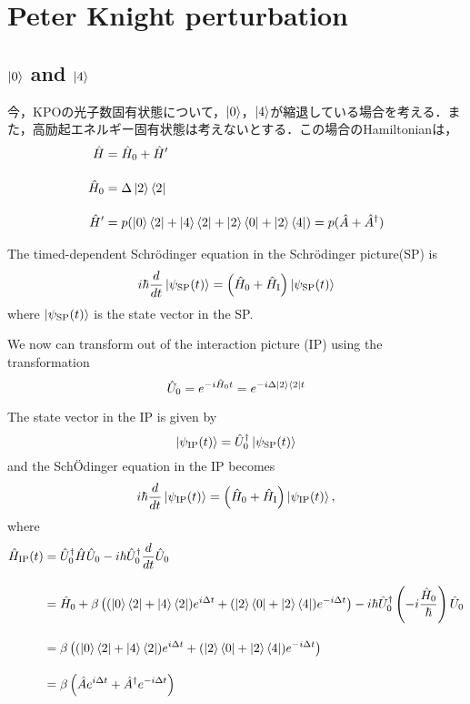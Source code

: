 \section{Peter Knight perturbation}
\subsection{$\ket{0}$ and $\ket{4}$}
今，KPOの光子数固有状態について，$\ket{0}$，$\ket{4}$が縮退している場合を考える．また，高励起エネルギー固有状態は考えないとする．この場合のHamiltonianは，
\begin{align}
    \hat{H} &= \hat{H}_0 + \hat{H}^{\prime}\\[10pt]
    \hat{H}_0 &= \Delta \ket{2}\bra{2}\nn[10pt]
    \hat{H}^{\prime} &
    = p(\ket{0}\bra{2} + \ket{4}\bra{2} + \ket{2}\bra{0} + \ket{2}\bra{4})
    = p(\hat{A} + \hat{A}^{\dagger})
\end{align}

The timed-dependent Schr\"{o}dinger equation in the Schr\"{o}dinger picture(SP) is
\begin{equation}
    i\hbar\frac{d}{dt}\ket{\psi_{\rm{SP}}(t)}
    =\left(
    \hat{H}_0+\hat{H}_{\rm{I}}
    \right)
    \ket{\psi_{\rm{SP}}(t)}
\end{equation}
where $\ket{\psi_{\rm{SP}}(t)}$ is the state vector in the SP.

We now can transform out of the interaction picture (IP) using the transformation
\begin{equation}
    {\hat{U}}_0=e^{-i\hat{H}_0 t}
    =e^{-i\Delta \ket{2}\bra{2} t}
\end{equation}

The state vector in the IP is given by
\begin{equation}
    \ket{\psi_{\rm{IP}}(t)}
    =\hat{U}_0^\dagger\ket{\psi_{\rm{SP}}(t)}
\end{equation}
and the Sch\"{O}dinger equation in the IP becomes
\begin{equation}
    i\hbar\frac{d}{dt}\ket{\psi_{\rm{IP}}(t)}
    =\left(
    \hat{H}_0+\hat{H}_{\rm{I}}
    \right)
    \ket{\psi_{\rm{IP}}(t)},
\end{equation}
where
\begin{align}
    \hat{H}_{\rm{IP}}(t)
    &=\hU_0^\dagger\hat{H}\hU_0
    -i\hbar\hat{U}_0^\dagger\frac{d}{dt}\hU_0\\[10pt]
    &=\hat{H}_0 + \beta \left(
    (\ket{0}\bra{2} + \ket{4}\bra{2})e^{i\Delta t} 
    + (\ket{2}\bra{0} + \ket{2}\bra{4})e^{-i\Delta t} 
    \right)
    -i\hbar\hat{U}_0^\dagger\left(
    -i\frac{\hat{H}_0}{\hbar}
    \right)\hU_0\\[10pt]
    &=\beta \left(
    (\ket{0}\bra{2} + \ket{4}\bra{2})e^{i\Delta t} 
    + (\ket{2}\bra{0} + \ket{2}\bra{4})e^{-i\Delta t} 
    \right)\nn[10pt]
    &=\beta \left(
    \hat{A}e^{i\Delta t} 
    + \hat{A}^{\dagger}e^{-i\Delta t} 
    \right)
\end{align}


